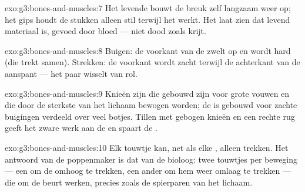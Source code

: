 \begin{solution}{exo:g3:bones-and-muscles:7}
Het levende  bouwt de breuk zelf langzaam weer op; het gips houdt de
stukken alleen stil terwijl het  werkt. Het laat zien dat  levend
materiaal is, gevoed door bloed --- niet dood zoals krijt.
\end{solution}

\begin{solution}{exo:g3:bones-and-muscles:8}
Buigen: de voorkant van de  zwelt op en wordt hard (die  trekt
samen). Strekken: de voorkant wordt zacht terwijl de achterkant van de
 aanspant --- het paar wisselt van rol.
\end{solution}

\begin{solution}{exo:g3:bones-and-muscles:9}
Knieën zijn  die gebouwd zijn voor grote vouwen en die door
de sterkste  van het lichaam bewogen worden; de  is
gebouwd voor zachte buigingen verdeeld over veel botjes. Tillen met
gebogen knieën en een rechte rug geeft het zware werk aan de  en
spaart de .
\end{solution}

\begin{solution}{exo:g3:bones-and-muscles:10}
Elk touwtje kan, net als elke , alleen trekken. Het antwoord van
de poppenmaker is dat van de bioloog: twee touwtjes per beweging ---
een om de  omhoog te trekken, een ander om hem weer omlaag te
trekken --- die om de beurt werken, precies zoals de spierparen van het
lichaam.
\end{solution}
